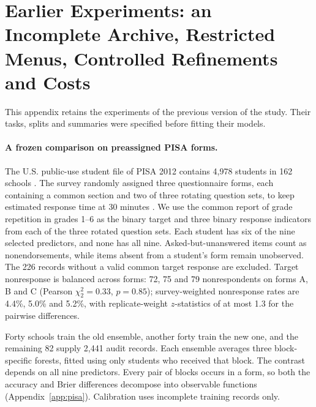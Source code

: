 \section{Earlier Experiments: an Incomplete Archive, Restricted Menus, Controlled Refinements and Costs}\label{sec:exp}
This appendix retains the experiments of the previous version of the study. Their tasks, splits and summaries were specified before fitting their models.

\paragraph{A frozen comparison on preassigned PISA forms.}
The U.S. public-use student file of PISA 2012 contains 4,978 students in 162 schools \citep{pisaus2014}. The survey randomly assigned three questionnaire forms, each containing a common section and two of three rotating question sets, to keep estimated response time at 30 minutes \citep{pisa2014,kastberg2014}. We use the common report of grade repetition in grades 1--6 as the binary target and three binary response indicators from each of the three rotated question sets. Each student has six of the nine selected predictors, and none has all nine. Asked-but-unanswered items count as nonendorsements, while items absent from a student's form remain unobserved. The 226 records without a valid common target response are excluded. Target nonresponse is balanced across forms: 72, 75 and 79 nonrespondents on forms A, B and C (Pearson $\chi^2_2=0.33$, $p=0.85$); survey-weighted nonresponse rates are 4.4\%, 5.0\% and 5.2\%, with replicate-weight $z$-statistics of at most 1.3 for the pairwise differences.

Forty schools train the old ensemble, another forty train the new one, and the remaining 82 supply 2,441 audit records. Each ensemble averages three block-specific forests, fitted using only students who received that block. The contrast depends on all nine predictors. Every pair of blocks occurs in a form, so both the accuracy and Brier differences decompose into observable functions (Appendix~\ref{app:pisa}). Calibration uses incomplete training records only.



